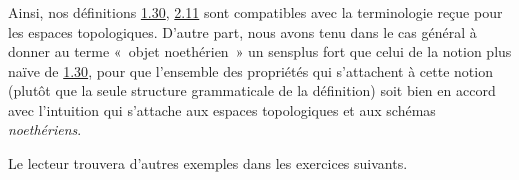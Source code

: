 \documentclass[10pt]{../fichiers-configuration-latex/smfart}
\begin{document}
\setcounter{subsection}{15}
\setcounter{subsubsection}{0}
\subsubsection{}
Ainsi, nos définitions \hyperref[VI.def1.30]{1.30}, \hyperref[VI.def2.11]{2.11} sont compatibles avec la
terminologie reçue pour les espaces topologiques. D'autre part, nous
avons tenu dans le cas général à donner au terme « objet
noethérien » un sens\pageoriginale plus fort que celui de la notion
plus naïve de \hyperref[VI.def1.30]{1.30}, pour que l'ensemble des propriétés qui s'attachent à cette
notion (plutôt que la seule structure grammaticale de la définition)
soit bien en accord avec l'intuition qui s'attache aux espaces
topologiques et aux schémas \emph{noethériens}.

Le lecteur trouvera d'autres exemples dans les exercices suivants.
\end{document}
